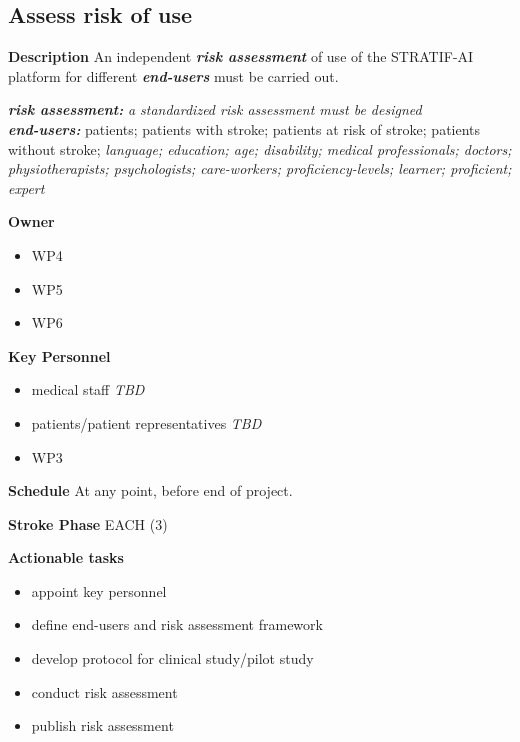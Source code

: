 \documentclass[
  letterpaper,
  DIV=11,
  numbers=noendperiod]{scrreport}
\providecommand{\tightlist}{%
  \setlength{\itemsep}{0pt}\setlength{\parskip}{0pt}}\usepackage{longtable,booktabs,array}
\begin{document}
\hypertarget{assess-risk-of-use}{%
\subsection{Assess risk of use}\label{assess-risk-of-use}}

\textbf{Description} An independent \textbf{\emph{risk assessment}} of
use of the STRATIF-AI platform for different \textbf{\emph{end-users}}
must be carried out.

\textbf{\emph{risk assessment:}} \emph{a standardized risk assessment
must be designed}\\
\textbf{\emph{end-users:}} patients; patients with stroke; patients at
risk of stroke; patients without stroke; \emph{language; education; age;
disability; medical professionals; doctors; physiotherapists;
psychologists; care-workers; proficiency-levels; learner; proficient;
expert}

\textbf{Owner}

\begin{itemize}
\tightlist
\item
  WP4
\item
  WP5
\item
  WP6
\end{itemize}

\textbf{Key Personnel}

\begin{itemize}
\tightlist
\item
  medical staff \emph{TBD}
\item
  patients/patient representatives \emph{TBD}
\item
  WP3
\end{itemize}

\textbf{Schedule} At any point, before end of project.

\textbf{Stroke Phase} EACH (3)

\textbf{Actionable tasks}

\begin{itemize}
\tightlist
\item
  appoint key personnel
\item
  define end-users and risk assessment framework
\item
  develop protocol for clinical study/pilot study
\item
  conduct risk assessment
\item
  publish risk assessment
\end{itemize}
\end{document}
